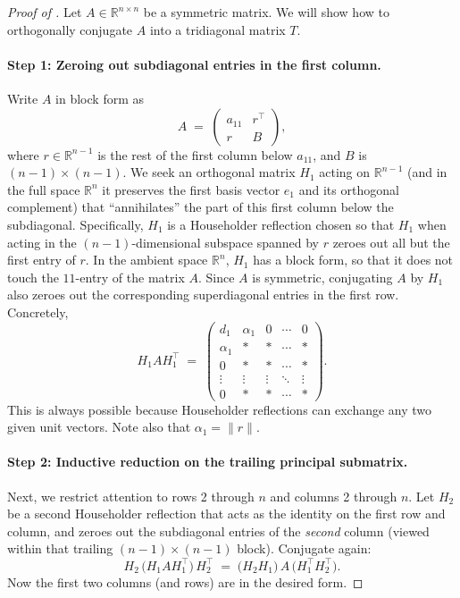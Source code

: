\documentclass[letterpaper,11pt,oneside,reqno]{book}
\numberwithin{equation}{chapter}  %
\theoremstyle{definition}
\begin{document}
\begin{proof}[Proof of ]
Let $A\in \mathbb{R}^{n\times n}$ be a symmetric matrix. We will show how to orthogonally conjugate $A$ into a tridiagonal matrix $T$.

\paragraph{Step 1: Zeroing out subdiagonal entries in the first column.}
Write $A$ in block form as
\[
  A \;=\;
  \begin{pmatrix}
    a_{11} & r^\top\\[3pt]
    r      & B
  \end{pmatrix},
\]
where $r\in \mathbb{R}^{n-1}$ is the rest of the first column below $a_{11}$, and $B$ is $(n-1)\times(n-1)$.
We seek an orthogonal matrix $H_1$ acting on $\mathbb{R}^{n-1}$ (and in the full space $\mathbb{R}^n$ it preserves the first
basis vector $e_1$ and its orthogonal complement)
that ``annihilates'' the part of this first column below the subdiagonal.
Specifically, $H_1$ is a Householder reflection chosen so that
$H_1$ when acting in the $(n-1)$-dimensional subspace spanned by $r$ zeroes out all but the first entry of $r$. In the ambient
space $\mathbb{R}^n$,
$H_1$ has a block form, so
that it does not touch the $11$-entry of the matrix $A$.
Since $A$ is symmetric, conjugating $A$ by $H_1$ also zeroes out the corresponding superdiagonal entries in the first row.  Concretely,
\[
  H_1 A H_1^\top
  \;=\;
  \begin{pmatrix}
    d_1 & \alpha_1 & 0 & \cdots & 0\\
    \alpha_1 & * & * & \cdots & *\\
    0 & * & * & \cdots & *\\
    \vdots & \vdots & \vdots & \ddots & \vdots\\
    0 & * & * & \cdots & *
  \end{pmatrix}.
\]
This is always possible because Householder reflections can exchange any two given unit vectors.
Note also that $\alpha_1=\|r\|$.

\paragraph{Step 2: Inductive reduction on the trailing principal submatrix.}
Next, we restrict attention to rows 2 through $n$ and columns 2 through $n$.  Let $H_2$ be a second Householder reflection that acts as the identity on the first row and column, and zeroes out the subdiagonal entries of the \emph{second} column (viewed within that trailing $(n-1)\times (n-1)$ block).  Conjugate again:
\[
  H_2\,\bigl(H_1 A H_1^\top\bigr)\,H_2^\top
  \;=\;
  \bigl(H_2H_1\bigr)\,A\,\bigl(H_1^\top H_2^\top\bigr).
\]
Now the first two columns (and rows) are in the desired form.


\end{proof}
\end{document}
